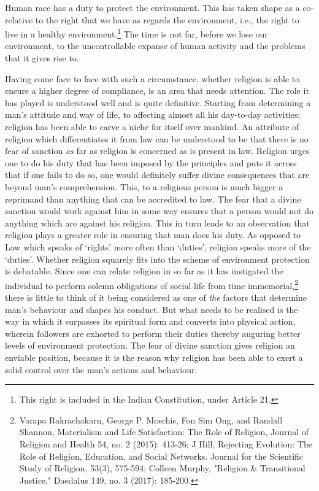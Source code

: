 \begin{multicols}{2}

\noi
Human race has a duty to protect the environment. This has taken shape as a co-relative to the
right that we have as regards the environment, i.e., the right to live in a healthy environment.\footnote{This right is included in the Indian Constitution, under Article 21.}
The time is not far, before we lose our environment, to the uncontrollable expanse of human
activity and the problems that it gives rise to.

\noi
Having come face to face with such a circumstance, whether religion is able to ensure a higher
degree of compliance, is an area that needs attention. The role it has played is understood well
and is quite definitive. Starting from determining a man’s attitude and way of life, to affecting
almost all his day-to-day activities; religion has been able to carve a niche for itself over
mankind. An attribute of religion which differentiates it from law can be understood to be that there is no fear of sanction \textit{as} far as religion is concerned as is present in law. Religion urges
one to do his duty that has been imposed by the principles and puts it across that if one fails to
do so, one would definitely suffer divine consequences that are beyond man’s comprehension.
This, to a religious person is much bigger a reprimand than anything that can be accredited to
law. The fear that a divine sanction would work against him in some way ensures that a person
would not do anything which are against his religion. This in turn leads to an observation that
religion plays a greater role in ensuring that man does his duty. As opposed to Law which
speaks of ‘rights’ more often than ‘duties’, religion speaks more of the ‘duties’. Whether
religion squarely fits into the scheme of environment protection is debatable. Since one can
relate religion in so far as it has instigated the individual to perform solemn obligations of social
life from time immemorial,\footnote{Varapa Rakrachakarn, George P. Moschis, Fon Sim Ong, and Randall Shannon, Materialism and Life Satisfaction: The Role of Religion, Journal of Religion and Health 54, no. 2 (2015): 413-26; J Hill, Rejecting Evolution: The Role of Religion, Education, and Social Networks. Journal for the Scientific Study of Religion, 53(3), 575-594; Colleen Murphy, "Religion \& Transitional Justice." Daedalus 149, no. 3 (2017): 185-200.} there is little to think of it being considered as one of \textit{the} factors that determine man’s behaviour and shapes his conduct. But what needs to be realised is the way in which it surpasses its spiritual form and converts into physical action, wherein followers are exhorted to perform their duties thereby auguring better levels of environment protection.
The fear of divine sanction gives religion an enviable position, because it is the reason why
religion has been able to exert a solid control over the man’s actions and behaviour.


\end{multicols}
